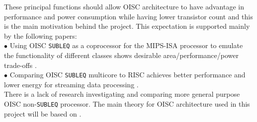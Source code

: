 \documentclass[a4paper,12pt]{article}
\begin{document}
\begin{multicols}{2}
These principal functions should allow OISC architecture to have advantage in performance and power consumption while having lower transistor count and this is the main motivation behind the project. This expectation is supported mainly by the following papers:
\\
$\bullet$ Using OISC \texttt{SUBLEQ} as a coprocessor for the MIPS-ISA processor to emulate the functionality of different classes shows desirable area/performance/power trade-offs \autocite{ahmed_sakamoto_anderson_hara-azumi_2015}.
\\
$\bullet$ Comparing OISC \texttt{SUBLEQ} multicore to RISC achieves better performance and lower energy for streaming data processing \autocite{yokota_saso_hara-azumi_2017}.
\\
There is a lack of research investigating and comparing more general purpose OISC non-\texttt{SUBLEQ} processor. The main theory for OISC architecture used in this project will be based on \autocite{ong_ang_seng_2010,gilreath_laplante_2003,kong_ang_seng_adejo_2010,dharshana_balasubramanian_arun_2016}.
\columnbreak

\end{multicols}
\end{document}
